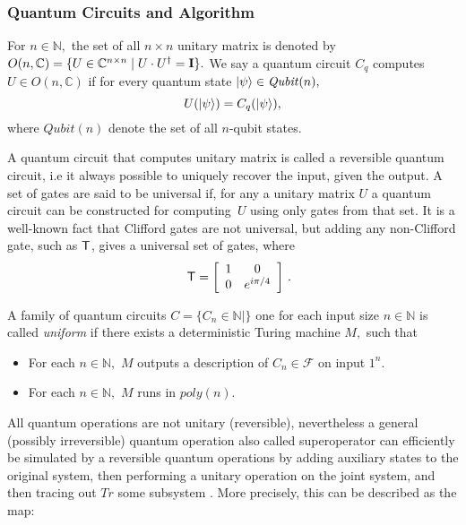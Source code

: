 \subsubsection{Quantum Circuits and Algorithm}

For $n\in \mathbb{N},$ the set of all $n\times n$ unitary matrix is denoted by $O(n,\mathbb{C})=\{U\in \mathbb{C}^{n\times n} \mid U\cdot U^\dagger={\bf I}\}.$ We say a quantum circuit $C_q$ computes $U\in O(n,\mathbb{C})$ if for every quantum state ${\lvert}\psi\rangle \in \mathit{Qubit}(n),$
$$U({\lvert}\psi\rangle )=C_q({\lvert}\psi\rangle),$$
where  $\mathit{Qubit}(n)$  denote the set of all $n$-qubit states. 

A quantum circuit that computes unitary matrix is called a reversible  quantum circuit, i.e it always possible to uniquely recover the input, given the output. A set of gates are said to be universal if, for any a unitary matrix $U$  a quantum circuit can be constructed for computing~$U$ using only gates from that set. It is a well-known fact that Clifford gates are not universal, but adding any non-Clifford gate, such as ${\sf T}$, gives a universal set of gates, where
$$\quad{\sf T} = \left[\begin{array}{cc} 1 & 0\\ 0 & e^{i\pi/4}\end{array}\right]\,.$$

A family of quantum circuits $C=\{C_n\in \mathbb{N} \mid \}$ one for each input  size $n\in \mathbb{N}$ is called \emph{uniform} if there exists a deterministic Turing machine $M,$ such that
 \begin{itemize}
 \item For each $n\in\mathbb{N},$ $M$ outputs a description of $C_n \in \mathcal{F}$ on input $1^n.$
 \item  For each $n\in\mathbb{N},$ $M$ runs in $poly(n).$
 \end{itemize}

All quantum operations are not unitary (reversible), nevertheless a general (possibly irreversible) quantum operation also called superoperator can efficiently be simulated by a reversible quantum operations by adding auxiliary states to the original system, then performing a unitary operation on the joint system, and then tracing out $Tr$ some subsystem \cite{}.  More precisely, this can be described as the map:

